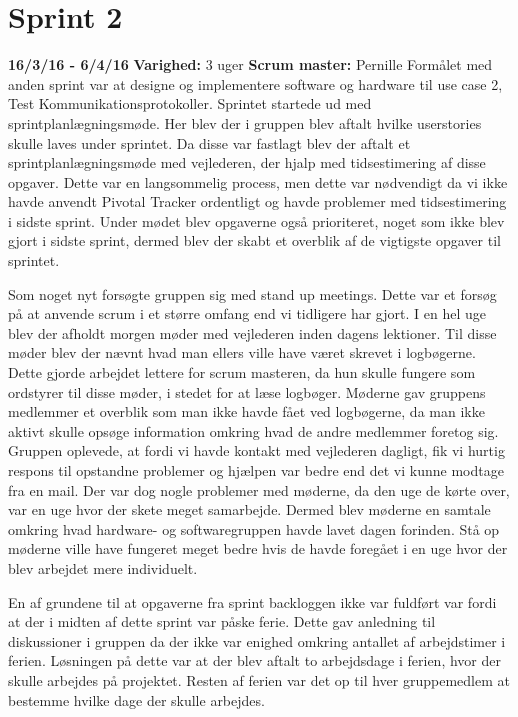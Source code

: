 	
	
	\section{Sprint 2}
	\textbf{16/3/16 - 6/4/16}\newline
	\textbf{Varighed:} 3 uger\newline	
	\textbf{Scrum master: }Pernille \newline
	Formålet med anden sprint var at designe og implementere software og hardware til use case 2, Test Kommunikationsprotokoller. Sprintet startede ud med sprintplanlægningsmøde. Her blev der i gruppen blev aftalt hvilke userstories skulle laves under sprintet. Da disse var fastlagt blev der aftalt et sprintplanlægningsmøde med vejlederen, der hjalp med tidsestimering af disse opgaver. Dette var en langsommelig process, men dette var nødvendigt da vi ikke havde anvendt Pivotal Tracker ordentligt og havde problemer med tidsestimering i sidste sprint. Under mødet blev opgaverne også prioriteret, noget som ikke blev gjort i sidste sprint, dermed blev der skabt et overblik af de vigtigste opgaver til sprintet. \newline
	
	Som noget nyt forsøgte gruppen sig med stand up meetings. Dette var et forsøg på at anvende scrum i et større omfang end vi tidligere har gjort. I en hel uge blev der afholdt morgen møder med vejlederen inden dagens lektioner. Til disse møder blev der nævnt hvad man ellers ville have været skrevet i logbøgerne. Dette gjorde arbejdet lettere for scrum masteren, da hun skulle fungere som ordstyrer til disse møder, i stedet for at læse logbøger. Møderne gav gruppens medlemmer et overblik som man ikke havde fået ved logbøgerne, da man ikke aktivt skulle opsøge information omkring hvad de andre medlemmer foretog sig. Gruppen oplevede, at fordi vi havde kontakt med vejlederen dagligt, fik vi hurtig respons til opstandne problemer og hjælpen var bedre end det vi kunne modtage fra en mail. Der var dog nogle problemer med møderne, da den uge de kørte over, var en uge hvor der skete meget samarbejde. Dermed blev møderne en samtale omkring hvad hardware- og softwaregruppen havde lavet dagen forinden. Stå op møderne ville have fungeret meget bedre hvis de havde foregået i en uge hvor der blev arbejdet mere individuelt. \newline
	
	En af grundene til at opgaverne fra sprint backloggen ikke var fuldført var fordi at der i midten af dette sprint var påske ferie. Dette gav anledning til diskussioner i gruppen da der ikke var enighed omkring antallet af arbejdstimer i ferien. Løsningen på dette var at der blev aftalt to arbejdsdage i ferien, hvor der skulle arbejdes på projektet. Resten af ferien var det op til hver gruppemedlem at bestemme hvilke dage der skulle arbejdes. \newline
	
